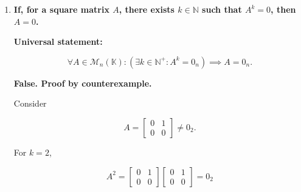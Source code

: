 \begin{enumerate}[label=\alph*)]
\begin{answer}
    \par\bigskip
    \noindent\textbf{Sufficient condition:}

    If $A$ is invertible, there exists
    $A^{-1}\in\mathcal{M}_n(\mathbb{K})$
    such that

    $$
    A^{-1}A=AA^{-1}=I_n.
    $$

    Multiplying both sides of $AB=AC$
    by $A^{-1}$ on the left:

    $$
    \begin{aligned}
        AB=AC
        &\implies A^{-1}(AB)=A^{-1}(AC) \\
        &\implies (A^{-1}A)B=(A^{-1}A)C \\
        &\implies I_nB=I_nC \\
        &\implies \boxed{B=C}.
    \end{aligned}
    $$

    Hence,

    $$
    \boxed{
        A\text{ invertible}
        \land AB=AC
        \implies B=C.
    }
    $$
\end{answer}


\item {\bfseries\boldmath
    If, for a square matrix $A$, there exists
    $k\in\mathbb{N}$ such that $A^k=0$,
    then $A=0$.
}

\begin{answer}
    \textbf{Universal statement:}

    $$
    \forall A\in\mathcal{M}_n(\mathbb{K}):
    \left(
        \exists k\in\mathbb{N}^+:
        A^k=0_n
    \right)
    \implies A=0_n.
    $$

    \textbf{False. Proof by counterexample.}

    Consider

    $$
    A=\begin{bmatrix}
        0 & 1 \\
        0 & 0
    \end{bmatrix}
    \neq0_2.
    $$

    For $k=2$,

    $$
    A^2
    =\begin{bmatrix}
        0 & 1 \\
        0 & 0
    \end{bmatrix}
    \begin{bmatrix}
        0 & 1 \\
        0 & 0
    \end{bmatrix} =0_2
    $$


\end{answer}
\end{enumerate}
